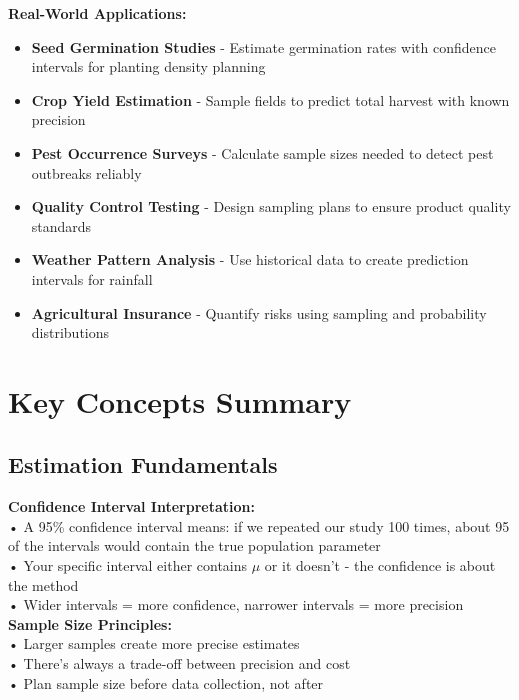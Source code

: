 \documentclass[11pt,a4paper]{article}
\begin{document}
\begin{infobox}
\textbf{Real-World Applications:}
\begin{itemize}
    \item \textbf{Seed Germination Studies} - Estimate germination rates with confidence intervals for planting density planning
    \item \textbf{Crop Yield Estimation} - Sample fields to predict total harvest with known precision
    \item \textbf{Pest Occurrence Surveys} - Calculate sample sizes needed to detect pest outbreaks reliably
    \item \textbf{Quality Control Testing} - Design sampling plans to ensure product quality standards
    \item \textbf{Weather Pattern Analysis} - Use historical data to create prediction intervals for rainfall
    \item \textbf{Agricultural Insurance} - Quantify risks using sampling and probability distributions
\end{itemize}
\end{infobox}

\section{Key Concepts Summary}

\subsection{Estimation Fundamentals}

\begin{estimationbox}
\textbf{Confidence Interval Interpretation:}\\
• A 95\% confidence interval means: if we repeated our study 100 times, about 95 of the intervals would contain the true population parameter\\
• Your specific interval either contains $\mu$ or it doesn't - the confidence is about the method\\
• Wider intervals = more confidence, narrower intervals = more precision\\[0.3cm]
\textbf{Sample Size Principles:}\\
• Larger samples create more precise estimates\\
• There's always a trade-off between precision and cost\\
• Plan sample size before data collection, not after
\end{estimationbox}
\end{document}
